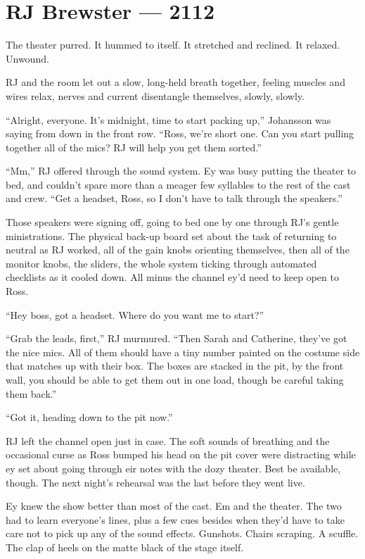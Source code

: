 \hypertarget{rj-brewster-2112}{%
\chapter*{RJ Brewster — 2112}\label{rj-brewster-2112}}

The theater purred. It hummed to itself. It stretched and reclined. It relaxed. Unwound.

RJ and the room let out a slow, long-held breath together, feeling muscles and wires relax, nerves and current disentangle themselves, slowly, slowly.

``Alright, everyone. It's midnight, time to start packing up,'' Johansson was saying from down in the front row. ``Ross, we're short one. Can you start pulling together all of the mics? RJ will help you get them sorted.''

``Mm,'' RJ offered through the sound system. Ey was busy putting the theater to bed, and couldn't spare more than a meager few syllables to the rest of the cast and crew. ``Get a headset, Ross, so I don't have to talk through the speakers.''

Those speakers were signing off, going to bed one by one through RJ's gentle ministrations. The physical back-up board set about the task of returning to neutral as RJ worked, all of the gain knobs orienting themselves, then all of the monitor knobs, the sliders, the whole system ticking through automated checklists as it cooled down. All minus the channel ey'd need to keep open to Ross.

``Hey boss, got a headset. Where do you want me to start?''

``Grab the leads, first,'' RJ murmured. ``Then Sarah and Catherine, they've got the nice mics. All of them should have a tiny number painted on the costume side that matches up with their box. The boxes are stacked in the pit, by the front wall, you should be able to get them out in one load, though be careful taking them back.''

``Got it, heading down to the pit now.''

RJ left the channel open just in case. The soft sounds of breathing and the occasional curse as Ross bumped his head on the pit cover were distracting while ey set about going through eir notes with the dozy theater. Best be available, though. The next night's rehearsal was the last before they went live.

Ey knew the show better than most of the cast. Em and the theater. The two had to learn everyone's lines, plus a few cues besides when they'd have to take care not to pick up any of the sound effects. Gunshots. Chairs scraping. A scuffle. The clap of heels on the matte black of the stage itself.

